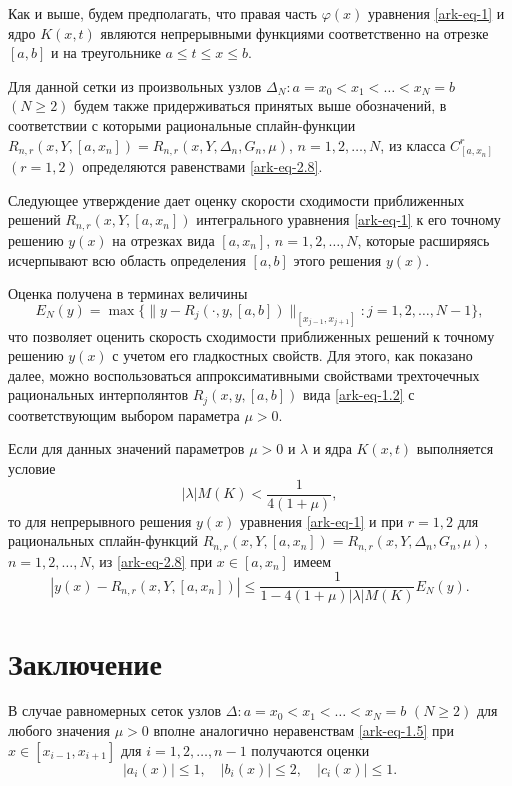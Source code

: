Как и выше, будем предполагать, что правая часть $\varphi(x)$ уравнения \eqref{ark-eq-1} и ядро
$K(x,t)$ являются непрерывными функциями соответственно на отрезке $[a,b]$ и на треугольнике
$a\leqslant t\leqslant x\leqslant b$.

Для данной сетки из произвольных узлов $\Delta_N: a=x_0<x_1<\dots <x_N=b$ $(N\geqslant 2)$
будем также придерживаться принятых выше обозначений, в соответствии с которыми рациональные
сплайн-функции $R_{n,r}(x,Y,[a,x_n])=R_{n,r}(x,Y,\Delta_n, G_n,\mu)$, $n=1,2,\dots,N$,
из класса $C^r_{[a,x_n]}$ $(r=1,2)$ определяются равенствами \eqref{ark-eq-2.8}.

Следующее утверждение дает оценку скорости сходимости приближенных решений
$R_{n,r}(x,Y,[a,x_n])$ интегрального уравнения \eqref{ark-eq-1} к его точному решению $y(x)$ на
отрезках вида $[a,x_n]$, $n=1,2,\dots,N$, которые расширяясь исчерпывают
всю область определения $[a,b]$ этого решения $y(x)$.

Оценка получена в терминах величины
\begin{equation}\label{ark-eq-3.1}
E_N(y)=\max\{\|y-R_j(\cdot, y, [a,b])\|_{[x_{j-1},x_{j+1}]}:j=1,2,\dots,N-1\},
\end{equation}
что позволяет оценить скорость сходимости приближенных решений к точному решению
$y(x)$ с учетом его гладкостных свойств. Для этого, как показано далее, можно воспользоваться
аппроксимативными свойствами трехточечных рациональных интерполянтов $R_j(x,y,[a,b])$
вида \eqref{ark-eq-1.2} с соответствующим выбором параметра $\mu>0$.

\begin{theorem} \label{ark-theo2}
Если для данных значений параметров $\mu>0$ и $\lambda$ и ядра $K(x,t)$ выполняется
условие
\begin{equation}\label{ark-eq-3.2}
|\lambda| M(K)< \frac 1{4(1+\mu)},
\end{equation}
то для непрерывного решения $y(x)$ уравнения \eqref{ark-eq-1} и при $r=1,2$ для
рациональных сплайн-функций $R_{n,r}(x,Y,[a,x_n])=R_{n,r}(x,Y,\Delta_n, G_n,\mu)$,
$n=1,2,\dots,N$, из \eqref{ark-eq-2.8} при $x\in[a,x_n]$ имеем
\begin{equation}\label{ark-eq-3.3}
|y(x)-R_{n,r}(x, Y,[a,x_n])|\leqslant  \frac 1{1-4(1+\mu)|\lambda|M(K)}E_N(y).
\end{equation}
\end{theorem}


\section{Заключение}
В случае равномерных сеток узлов $\Delta: a=x_0<x_1<\dots<x_N=b$ $(N\geqslant 2)$ для любого
значения $\mu>0$ вполне аналогично неравенствам \eqref{ark-eq-1.5} при $x\in[x_{i-1}, x_{i+1}]$
для $i=1,2,\dots,n-1$ получаются оценки
$$
|a_i(x)|\leqslant 1,\quad |b_i(x)|\leqslant 2,\quad |c_i(x)|\leqslant 1.
$$

